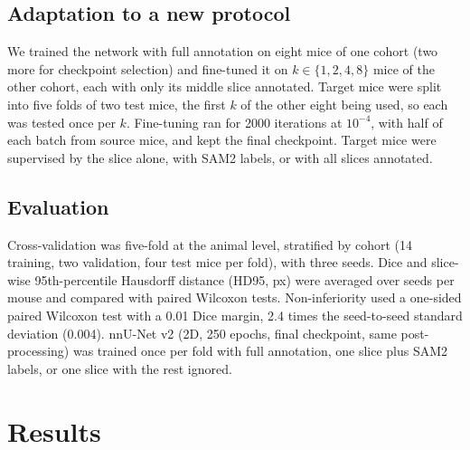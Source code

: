 \subsection{Adaptation to a new protocol}
\label{sec:adapt}

We trained the network with full annotation on eight mice of one cohort (two more for checkpoint selection) and fine-tuned it on $k\in\{1,2,4,8\}$ mice of the other cohort, each with only its middle slice annotated. Target mice were split into five folds of two test mice, the first $k$ of the other eight being used, so each was tested once per $k$. Fine-tuning ran for 2000 iterations at $10^{-4}$, with half of each batch from source mice, and kept the final checkpoint. Target mice were supervised by the slice alone, with SAM2 labels, or with all slices annotated.

\subsection{Evaluation}

Cross-validation was five-fold at the animal level, stratified by cohort (14 training, two validation, four test mice per fold), with three seeds. Dice and slice-wise 95th-percentile Hausdorff distance (HD95, px) were averaged over seeds per mouse and compared with paired Wilcoxon tests. Non-inferiority used a one-sided paired Wilcoxon test with a 0.01 Dice margin, 2.4 times the seed-to-seed standard deviation (0.004). nnU-Net v2 \cite{isensee2021nnunet} (2D, 250 epochs, final checkpoint, same post-processing) was trained once per fold with full annotation, one slice plus SAM2 labels, or one slice with the rest ignored.

\section{Results}
\label{sec:results}

